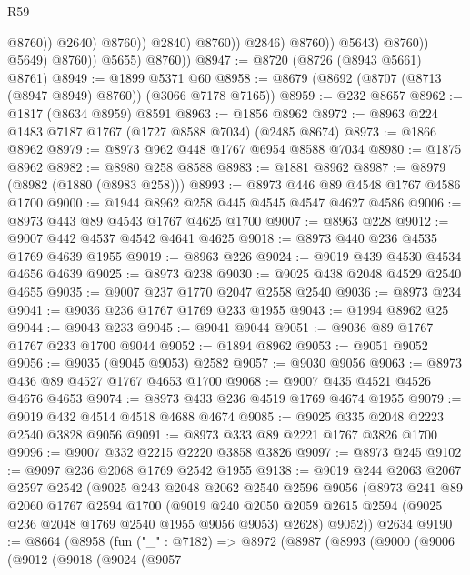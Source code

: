 \begin{lexlean}{R59}
\begin{coremodule}
                                            @8760))
                                        @2640)
                                      @8760))
                                  @2840)
                                @8760))
                            @2846)
                          @8760))
                      @5643)
                    @8760))
                @5649)
              @8760))
          @5655)
        @8760))
@8947 := @8720 (@8726 (@8943 @5661) @8761)
@8949 := @1899 @5371 @60
@8958 := @8679 (@8692 (@8707 (@8713 (@8947 @8949) @8760)) (@3066 @7178 @7165))
@8959 := @232 @8657
@8962 := @1817 (@8634 @8959) @8591
@8963 := @1856 @8962
@8972 := @8963 @224 @1483 @7187 @1767 (@1727 @8588 @7034) (@2485 @8674)
@8973 := @1866 @8962
@8979 := @8973 @962 @448 @1767 @6954 @8588 @7034
@8980 := @1875 @8962
@8982 := @8980 @258 @8588
@8983 := @1881 @8962
@8987 := @8979 (@8982 (@1880 (@8983 @258)))
@8993 := @8973 @446 @89 @4548 @1767 @4586 @1700
@9000 := @1944 @8962 @258 @445 @4545 @4547 @4627 @4586
@9006 := @8973 @443 @89 @4543 @1767 @4625 @1700
@9007 := @8963 @228
@9012 := @9007 @442 @4537 @4542 @4641 @4625
@9018 := @8973 @440 @236 @4535 @1769 @4639 @1955
@9019 := @8963 @226
@9024 := @9019 @439 @4530 @4534 @4656 @4639
@9025 := @8973 @238
@9030 := @9025 @438 @2048 @4529 @2540 @4655
@9035 := @9007 @237 @1770 @2047 @2558 @2540
@9036 := @8973 @234
@9041 := @9036 @236 @1767 @1769 @233 @1955
@9043 := @1994 @8962 @25
@9044 := @9043 @233
@9045 := @9041 @9044
@9051 := @9036 @89 @1767 @1767 @233 @1700 @9044
@9052 := @1894 @8962
@9053 := @9051 @9052
@9056 := @9035 (@9045 @9053) @2582
@9057 := @9030 @9056
@9063 := @8973 @436 @89 @4527 @1767 @4653 @1700
@9068 := @9007 @435 @4521 @4526 @4676 @4653
@9074 := @8973 @433 @236 @4519 @1769 @4674 @1955
@9079 := @9019 @432 @4514 @4518 @4688 @4674
@9085 := @9025 @335 @2048 @2223 @2540 @3828 @9056
@9091 := @8973 @333 @89 @2221 @1767 @3826 @1700
@9096 := @9007 @332 @2215 @2220 @3858 @3826
@9097 := @8973 @245
@9102 := @9097 @236 @2068 @1769 @2542 @1955
@9138 := @9019
    @244
    @2063
    @2067
    @2597
    @2542
    (@9025
      @243
      @2048
      @2062
      @2540
      @2596
      @9056
      (@8973
        @241
        @89
        @2060
        @1767
        @2594
        @1700
        (@9019 @240 @2050 @2059 @2615 @2594 (@9025 @236 @2048 @1769 @2540 @1955 @9056 @9053) @2628)
        @9052))
    @2634
@9190 := @8664
    (@8958
      (fun ("_" : @7182) =>
      @8972
        (@8987
          (@8993
            (@9000
              (@9006
                (@9012
                  (@9018
                    (@9024
                      (@9057

\end{coremodule}
\end{lexlean}
